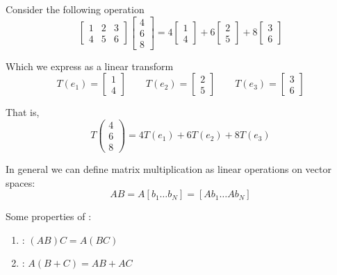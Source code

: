 \documentclass{article}
\begin{document}
\begin{example}
  Consider the following operation
  \[
    \left[\begin{matrix}
        1 & 2 & 3 \\
        4 & 5 & 6
    \end{matrix}\right]
    \left[\begin{matrix}
        4 \\ 6 \\ 8
    \end{matrix}\right]
    =
    4 \left[\begin{matrix}
        1 \\
        4
    \end{matrix}\right]
    +
    6 \left[\begin{matrix}
        2 \\
        5
    \end{matrix}\right]
    +
    8 \left[\begin{matrix}
        3 \\
        6
    \end{matrix}\right]
  \]

  Which we express as a linear transform
  \[
    T(e_1) = \left[\begin{matrix}
        1 \\
        4
    \end{matrix}\right]
    \quad\quad
    T(e_2) =  \left[\begin{matrix}
        2 \\
        5
    \end{matrix}\right]
    \quad\quad
    T(e_3) = \left[\begin{matrix}
        3 \\
        6
    \end{matrix}\right]
  \]

  That is,
  \[
    T\left(\begin{matrix}
    4 \\ 6 \\ 8
    \end{matrix}\right)
    =
    4 T(e_1)
    + 6 T(e_2)
    + 8 T(e_3)
  \]
\end{example}

In general we can define matrix multiplication as linear operations on vector spaces:
\[
  A B = A [b_1 \ldots b_N] = \left[A b_1 \ldots Ab_N\right]
\]

Some properties of :
\begin{enumerate}
  \item {}: $(AB)C = A(BC)$
  \item {}: $A(B + C) = AB + AC$
\end{enumerate}
\end{document}
